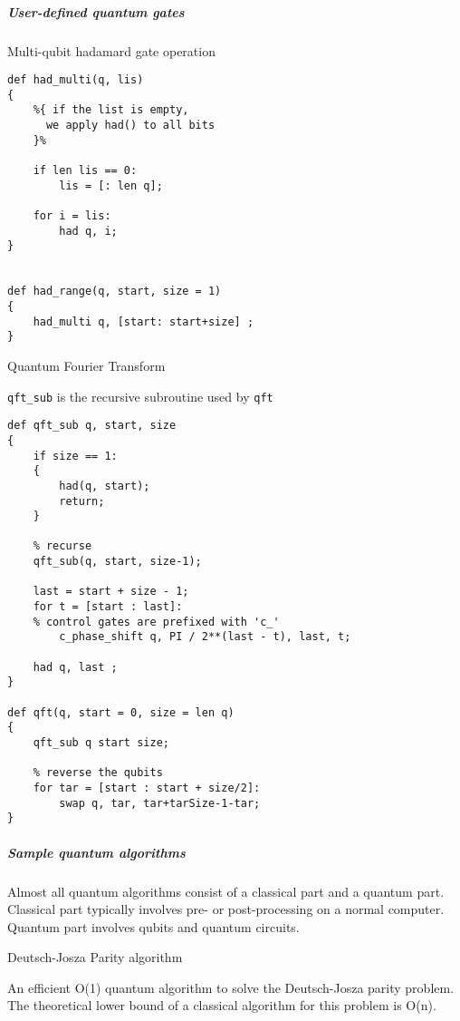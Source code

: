 \documentclass[]{article}
\begin{document}
\subparagraph{User-defined quantum
gates}\label{user-defined-quantum-gates}

Multi-qubit hadamard gate operation

\begin{verbatim}
def had_multi(q, lis)
{
    %{ if the list is empty, 
      we apply had() to all bits
    }%

    if len lis == 0:
        lis = [: len q];

    for i = lis:
        had q, i;
}


def had_range(q, start, size = 1)
{
    had_multi q, [start: start+size] ;
}
\end{verbatim}

Quantum Fourier Transform

\texttt{qft\_sub} is the recursive subroutine used by \texttt{qft}

\begin{verbatim}
def qft_sub q, start, size
{
    if size == 1:
    {
        had(q, start);
        return;
    }

    % recurse
    qft_sub(q, start, size-1);

    last = start + size - 1;
    for t = [start : last]:
    % control gates are prefixed with 'c_'
        c_phase_shift q, PI / 2**(last - t), last, t;

    had q, last ;
}

def qft(q, start = 0, size = len q)
{
    qft_sub q start size;

    % reverse the qubits
    for tar = [start : start + size/2]:
        swap q, tar, tar+tarSize-1-tar;
}
\end{verbatim}

\subparagraph{Sample quantum
algorithms}\label{sample-quantum-algorithms}

Almost all quantum algorithms consist of a classical part and a quantum
part. Classical part typically involves pre- or post-processing on a
normal computer. Quantum part involves qubits and quantum circuits.

Deutsch-Josza Parity algorithm

An efficient O(1) quantum algorithm to solve the Deutsch-Josza parity
problem. The theoretical lower bound of a classical algorithm for this
problem is O(n).
\end{document}
